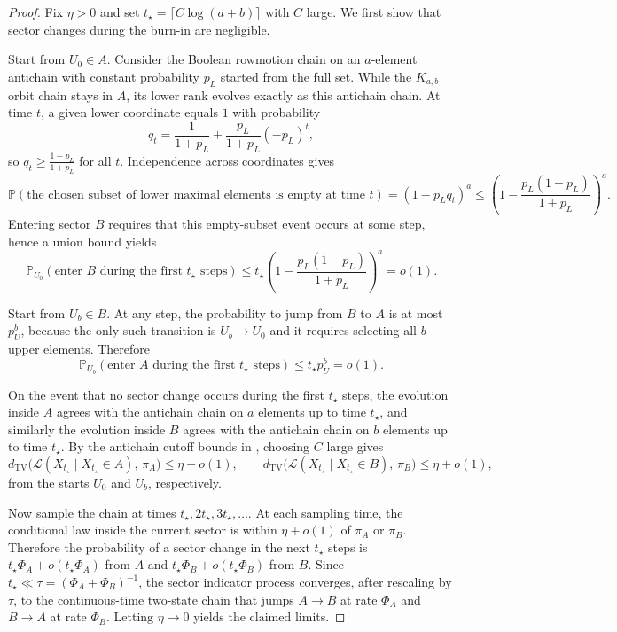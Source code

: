 \documentclass[final,3p,times]{elsarticle}
\theoremstyle{definition}
\newcommand{\PP}{\mathbb{P}}
\newcommand{\TV}{d_{\mathrm{TV}}}
\begin{document}
\begin{proof}
Fix $\eta>0$ and set $t_\star=\lceil C\log(a+b)\rceil$ with $C$ large.
We first show that sector changes during the burn-in are negligible.

Start from $U_0\in A$.
Consider the Boolean rowmotion chain on an $a$-element antichain with constant probability $p_L$ started from the full set.
While the $K_{a,b}$ orbit chain stays in $A$, its lower rank evolves exactly as this antichain chain.
At time $t$, a given lower coordinate equals $1$ with probability
\[
q_t=\frac{1}{1+p_L}+\frac{p_L}{1+p_L}(-p_L)^t,
\]
so $q_t\ge \frac{1-p_L}{1+p_L}$ for all $t$.
Independence across coordinates gives
\[
\PP(\text{the chosen subset of lower maximal elements is empty at time }t)
=
(1-p_L q_t)^a
\le
\left(1-\frac{p_L(1-p_L)}{1+p_L}\right)^a.
\]
Entering sector $B$ requires that this empty-subset event occurs at some step, hence a union bound yields
\[
\PP_{U_0}(\text{enter }B\text{ during the first }t_\star\text{ steps})
\le
t_\star\left(1-\frac{p_L(1-p_L)}{1+p_L}\right)^a
=o(1).
\]

Start from $U_b\in B$.
At any step, the probability to jump from $B$ to $A$ is at most $p_U^b$, because the only such transition is $U_b\to U_0$ and it requires selecting all $b$ upper elements.
Therefore
\[
\PP_{U_b}(\text{enter }A\text{ during the first }t_\star\text{ steps})
\le t_\star p_U^b=o(1).
\]

On the event that no sector change occurs during the first $t_\star$ steps, the evolution inside $A$ agrees with the antichain chain on $a$ elements up to time $t_\star$, and similarly the evolution inside $B$ agrees with the antichain chain on $b$ elements up to time $t_\star$.
By the antichain cutoff bounds in \cite[Theorem 1.6]{DefantLiNestoridi2024Rowmotion}, choosing $C$ large gives
\[
\TV\bigl(\mathcal{L}(X_{t_\star}\mid X_{t_\star}\in A),\,\pi_A\bigr)\le \eta+o(1),
\qquad
\TV\bigl(\mathcal{L}(X_{t_\star}\mid X_{t_\star}\in B),\,\pi_B\bigr)\le \eta+o(1),
\]
from the starts $U_0$ and $U_b$, respectively.

Now sample the chain at times $t_\star,2t_\star,3t_\star,\dots$.
At each sampling time, the conditional law inside the current sector is within $\eta+o(1)$ of $\pi_A$ or $\pi_B$.
Therefore the probability of a sector change in the next $t_\star$ steps is $t_\star\Phi_A+o(t_\star\Phi_A)$ from $A$ and $t_\star\Phi_B+o(t_\star\Phi_B)$ from $B$.
Since $t_\star\ll \tau=(\Phi_A+\Phi_B)^{-1}$, the sector indicator process converges, after rescaling by $\tau$, to the continuous-time two-state chain that jumps $A\to B$ at rate $\Phi_A$ and $B\to A$ at rate $\Phi_B$.
Letting $\eta\to 0$ yields the claimed limits.
\end{proof}
\end{document}
